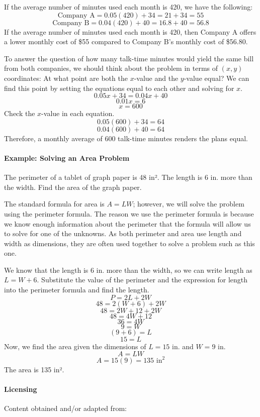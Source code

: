 If the average number of minutes used each month is 420, we have the following:
$$
\text{Company A} = 0.05(420) + 34 = 21 + 34 = 55
$$
$$
\text{Company B} = 0.04(420) + 40 = 16.8 + 40 = 56.8
$$
If the average number of minutes used each month is 420, then Company A offers a lower monthly cost of \$55 compared to Company B's monthly cost of \$56.80.

To answer the question of how many talk-time minutes would yield the same bill from both companies, we should think about the problem in terms of $(x, y)$ coordinates: At what point are both the $x$-value and the $y$-value equal? We can find this point by setting the equations equal to each other and solving for $x$.
$$
0.05x + 34 = 0.04x + 40
$$
$$
0.01x = 6
$$
$$
x = 600
$$
Check the $x$-value in each equation.
$$
0.05(600) + 34 = 64
$$
$$
0.04(600) + 40 = 64
$$
Therefore, a monthly average of 600 talk-time minutes renders the plans equal.

\paragraph{Example: Solving an Area Problem}

The perimeter of a tablet of graph paper is 48 in². The length is 6 in. more than the width. Find the area of the graph paper.

The standard formula for area is $A = LW$; however, we will solve the problem using the perimeter formula. The reason we use the perimeter formula is because we know enough information about the perimeter that the formula will allow us to solve for one of the unknowns. As both perimeter and area use length and width as dimensions, they are often used together to solve a problem such as this one.

We know that the length is 6 in. more than the width, so we can write length as $L = W + 6$. Substitute the value of the perimeter and the expression for length into the perimeter formula and find the length.
$$
P = 2L + 2W
$$
$$
48 = 2(W + 6) + 2W
$$
$$
48 = 2W + 12 + 2W
$$
$$
48 = 4W + 12
$$
$$
36 = 4W
$$
$$
9 = W
$$
$$
(9 + 6) = L
$$
$$
15 = L
$$
Now, we find the area given the dimensions of $L = 15$ in. and $W = 9$ in.
$$
A = LW
$$
$$
A = 15(9) = 135 \text{ in}^2
$$
The area is 135 in².

\paragraph{Licensing}

Content obtained and/or adapted from:

